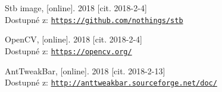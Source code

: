 \documentclass[czech,public,dept460,male,cpdeclaration]{diploma}
\begin{document}
\begin{thebibliography}{99}
	 Stb image,
		[online]. 2018 [cit. 2018-2-4]\\
		Dostupné z: \href{https://github.com/nothings/stb}{\texttt{https://github.com/nothings/stb}}
		
	 OpenCV,
		[online]. 2018 [cit. 2018-2-4]\\
		Dostupné z: \href{https://opencv.org/}{\texttt{https://opencv.org/}}
		
	 AntTweakBar,
		[online]. 2018 [cit. 2018-2-13]\\
		Dostupné z: \href{http://anttweakbar.sourceforge.net/doc/}{\texttt{http://anttweakbar.sourceforge.net/doc/}}
		
\end{thebibliography}



\end{document}
